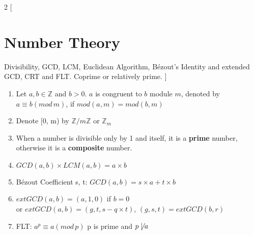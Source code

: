 \documentclass[]{article}
\begin{document}
\begin{multicols}{2}
[
\section{Number Theory}
Divisibility, GCD, LCM, Euclidean Algorithm, Bézout's Identity and extended GCD, CRT and FLT. Coprime or relatively prime.
]

\begin{enumerate}
    \item Let $a, b \in \mathbb{Z}$ and $b > 0$. $a$ is congruent to $b$ module $m$,
    denoted by $a \equiv b (mod\, m)$, if $mod(a, m) = mod(b, m)$
    \item Denote [0, m) by $\mathbb{Z}/m\mathbb{Z}$ or $\mathbb{Z}_m$
    \item When a number is divisible only by 1 and itself, it is a \textbf{prime} number, otherwise it is a \textbf{composite} number.
    \item $GCD(a, b) \times LCM(a, b) = a \times b$
    \item Bézout Coefficient s, t: $GCD(a, b) = s \times a + t \times b$
    \item $extGCD(a, b) = (a, 1, 0)$ if $b = 0$ \\
    or $extGCD(a, b) = (g, t, s - q \times t)$, $(g, s, t) = extGCD(b, r)$
    \item FLT: $a^p \equiv a (mod\, p)$ p is prime and $p \not \mid a$
\end{enumerate}

\end{multicols}
\end{document}
